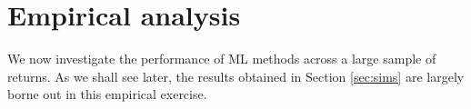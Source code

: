 \documentclass{article}
\begin{document}



\section{Empirical analysis}
We now investigate the performance of ML methods across a large sample of returns. As we shall see later, the results obtained in Section \ref{sec:sims} are largely borne out in this empirical exercise. 
\end{document}
